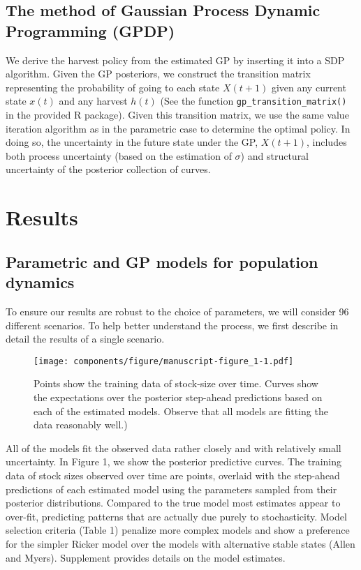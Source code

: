 \documentclass[author-year, 12pt,review]{components/elsarticle} %
\makeatletter
\def\maxwidth{\ifdim\Gin@nat@width>\linewidth\linewidth
\else\Gin@nat@width\fi}
\let\Oldincludegraphics\includegraphics
\renewcommand{\includegraphics}[1]{\Oldincludegraphics[width=\maxwidth]{#1}}
\makeatother
\begin{document}
\subsection{The method of Gaussian Process Dynamic Programming
(GPDP)}\label{the-method-of-gaussian-process-dynamic-programming-gpdp}

We derive the harvest policy from the estimated GP by inserting it into
a SDP algorithm. Given the GP posteriors, we construct the transition
matrix representing the probability of going to each state \(X(t+1)\)
given any current state \(x(t)\) and any harvest \(h(t)\) (See the
function \texttt{gp\_transition\_matrix()} in the provided R package).
Given this transition matrix, we use the same value iteration algorithm
as in the parametric case to determine the optimal policy. In doing so,
the uncertainty in the future state under the GP, \(X(t+1)\), includes
both process uncertainty (based on the estimation of \(\sigma\)) and
structural uncertainty of the posterior collection of curves.

\section{Results}\label{results}

\subsection{Parametric and GP models for population
dynamics}\label{parametric-and-gp-models-for-population-dynamics}

To ensure our results are robust to the choice of parameters, we will
consider 96 different scenarios. To help better understand the process,
we first describe in detail the results of a single scenario.

\begin{figure}[htbp]
\centering
\texttt{[image: components/figure/manuscript-figure\_1-1.pdf]}
\caption{Points show the training data of stock-size over time. Curves
show the expectations over the posterior step-ahead predictions based on
each of the estimated models. Observe that all models are fitting the
data reasonably well.)}
\end{figure}

All of the models fit the observed data rather closely and with
relatively small uncertainty. In Figure 1, we show the posterior
predictive curves. The training data of stock sizes observed over time
are points, overlaid with the step-ahead predictions of each estimated
model using the parameters sampled from their posterior distributions.
Compared to the true model most estimates appear to over-fit, predicting
patterns that are actually due purely to stochasticity. Model selection
criteria (Table 1) penalize more complex models and show a preference
for the simpler Ricker model over the models with alternative stable
states (Allen and Myers). Supplement provides details on the model
estimates.
\end{document}
